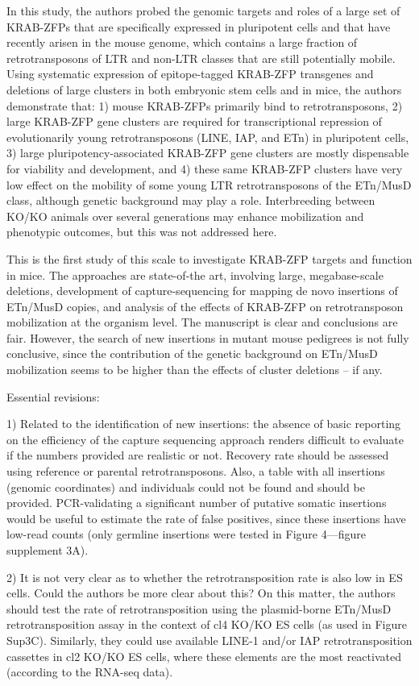 \documentclass[11pt,a4paper]{article}
\begin{document}
In this study, the authors probed the genomic targets and roles of a large set of KRAB-ZFPs that are specifically expressed in pluripotent cells and that have recently arisen in the mouse genome, which contains a large fraction of retrotransposons of LTR and non-LTR classes that are still potentially mobile. Using systematic expression of epitope-tagged KRAB-ZFP transgenes and deletions of large clusters in both embryonic stem cells and in mice, the authors demonstrate that: 1) mouse KRAB-ZFPs primarily bind to retrotransposons, 2) large KRAB-ZFP gene clusters are required for transcriptional repression of evolutionarily young retrotransposons (LINE, IAP, and ETn) in pluripotent cells, 3) large pluripotency-associated KRAB-ZFP gene clusters are mostly dispensable for viability and development, and 4) these same KRAB-ZFP clusters have very low effect on the mobility of some young LTR retrotransposons of the ETn/MusD class, although genetic background may play a role. Interbreeding between KO/KO animals over several generations may enhance mobilization and phenotypic outcomes, but this was not addressed here.

This is the first study of this scale to investigate KRAB-ZFP targets and function in mice. The approaches are state-of-the art, involving large, megabase-scale deletions, development of capture-sequencing for mapping de novo insertions of ETn/MusD copies, and analysis of the effects of KRAB-ZFP on retrotransposon mobilization at the organism level. The manuscript is clear and conclusions are fair. However, the search of new insertions in mutant mouse pedigrees is not fully conclusive, since the contribution of the genetic background on ETn/MusD mobilization seems to be higher than the effects of cluster deletions – if any.

Essential revisions:

1) Related to the identification of new insertions: the absence of basic reporting on the efficiency of the capture sequencing approach renders difficult to evaluate if the numbers provided are realistic or not. Recovery rate should be assessed using reference or parental retrotransposons. Also, a table with all insertions (genomic coordinates) and individuals could not be found and should be provided. PCR-validating a significant number of putative somatic insertions would be useful to estimate the rate of false positives, since these insertions have low-read counts (only germline insertions were tested in Figure 4—figure supplement 3A).

2) It is not very clear as to whether the retrotransposition rate is also low in ES cells. Could the authors be more clear about this? On this matter, the authors should test the rate of retrotransposition using the plasmid-borne ETn/MusD retrotransposition assay in the context of cl4 KO/KO ES cells (as used in Figure Sup3C). Similarly, they could use available LINE-1 and/or IAP retrotransposition cassettes in cl2 KO/KO ES cells, where these elements are the most reactivated (according to the RNA-seq data).
\end{document}
